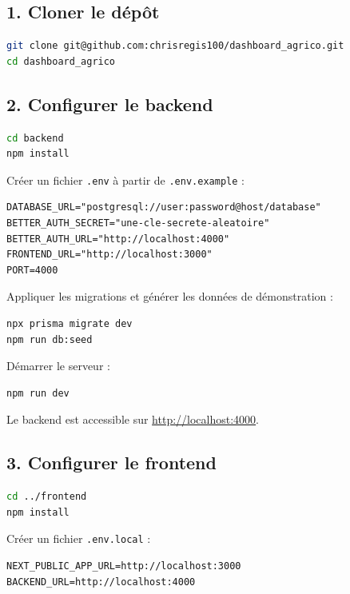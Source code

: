 \documentclass[11pt,a4paper]{report}
\begin{document}
\subsection*{1. Cloner le dépôt}
\begin{lstlisting}[language=bash,numbers=none]
git clone git@github.com:chrisregis100/dashboard_agrico.git
cd dashboard_agrico
\end{lstlisting}

\subsection*{2. Configurer le backend}
\begin{lstlisting}[language=bash,numbers=none]
cd backend
npm install
\end{lstlisting}

Créer un fichier \texttt{.env} à partir de \texttt{.env.example} :
\begin{lstlisting}[numbers=none]
DATABASE_URL="postgresql://user:password@host/database"
BETTER_AUTH_SECRET="une-cle-secrete-aleatoire"
BETTER_AUTH_URL="http://localhost:4000"
FRONTEND_URL="http://localhost:3000"
PORT=4000
\end{lstlisting}

Appliquer les migrations et générer les données de démonstration :
\begin{lstlisting}[language=bash,numbers=none]
npx prisma migrate dev
npm run db:seed
\end{lstlisting}

Démarrer le serveur :
\begin{lstlisting}[language=bash,numbers=none]
npm run dev
\end{lstlisting}

Le backend est accessible sur \url{http://localhost:4000}.

\subsection*{3. Configurer le frontend}
\begin{lstlisting}[language=bash,numbers=none]
cd ../frontend
npm install
\end{lstlisting}

Créer un fichier \texttt{.env.local} :
\begin{lstlisting}[numbers=none]
NEXT_PUBLIC_APP_URL=http://localhost:3000
BACKEND_URL=http://localhost:4000
\end{lstlisting}
\end{document}
